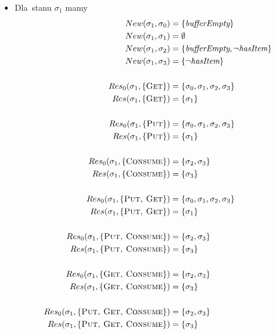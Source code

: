 \documentclass[11pt,a4paper]{article}
\begin{document}
\begin{itemize}
    \item Dla~stanu $\sigma_1$ mamy
    \begin{align*}
        New(\sigma_1, \sigma_0) &= \{ \textit{bufferEmpty} \} \\
        New(\sigma_1, \sigma_1) &= \emptyset \\
        New(\sigma_1, \sigma_2) &= \{ \textit{bufferEmpty}, \neg \textit{hasItem} \} \\
        New(\sigma_1, \sigma_3) &= \{ \neg \textit{hasItem} \} \\
        \\
        Res_0(\sigma_1, \{ \textsc{Get} \}) &= \{ \sigma_0, \sigma_1, \sigma_2, \sigma_3 \} \\
        Res(\sigma_1, \{ \textsc{Get} \}) &= \{ \sigma_1 \} \\
        \\
        Res_0(\sigma_1, \{ \textsc{Put} \}) &= \{ \sigma_0, \sigma_1, \sigma_2, \sigma_3 \} \\
        Res(\sigma_1, \{ \textsc{Put} \}) &= \{ \sigma_1 \} \\
        \\
        Res_0(\sigma_1, \{ \textsc{Consume} \}) &= \{ \sigma_2, \sigma_3 \} \\
        Res(\sigma_1, \{ \textsc{Consume} \}) &= \{ \sigma_3 \} \\
        \\
        Res_0(\sigma_1, \{ \textsc{Put, Get} \}) &= \{ \sigma_0, \sigma_1, \sigma_2, \sigma_3 \} \\
        Res(\sigma_1, \{ \textsc{Put, Get} \}) &= \{ \sigma_1 \} \\
        \\
        Res_0(\sigma_1, \{ \textsc{Put, Consume} \}) &= \{ \sigma_2, \sigma_3 \} \\
        Res(\sigma_1, \{ \textsc{Put, Consume} \}) &= \{ \sigma_3 \} \\
        \\
        Res_0(\sigma_1, \{ \textsc{Get, Consume} \}) &= \{ \sigma_2, \sigma_3 \} \\
        Res(\sigma_1, \{ \textsc{Get, Consume} \}) &= \{ \sigma_3 \} \\
        \\
        Res_0(\sigma_1, \{ \textsc{Put, Get, Consume} \}) &= \{ \sigma_2, \sigma_3 \} \\
        Res(\sigma_1, \{ \textsc{Put, Get, Consume} \}) &= \{ \sigma_3 \}
    \end{align*}
    

\end{itemize}
\end{document}
